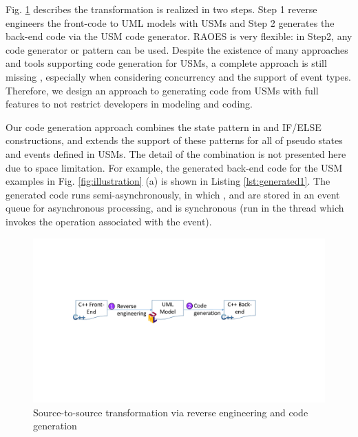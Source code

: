 Fig. \ref{fig:s2stransformation} describes the transformation is realized in two steps.
Step 1 reverse engineers the front-code to UML models with USMs and Step 2 generates the back-end code via the USM code generator.
RAOES is very flexible: in Step2, any code generator or pattern can be used. 
Despite the existence of many approaches and tools supporting code generation for USMs, a complete approach is still missing \cite{Badreddin2014}, especially when considering concurrency and the support of event types.
Therefore, 
we design an approach to generating code from USMs with full features to not restrict developers in modeling and coding. 

Our code generation approach combines the state pattern in \cite{niaz_mapping_2004} and IF/ELSE constructions, and extends the support of these patterns for all of pseudo states and events defined in USMs.
The detail of the combination is not presented here due to space limitation.
For example, the generated back-end code for the USM examples in Fig. \ref{fig:illustration} (a) is shown in Listing \ref{lst:generated1}. 
The generated code runs semi-asynchronously, in which ,  and  are stored in an event queue for asynchronous processing, and  is synchronous (run in the thread which invokes the operation associated with the event).


\begin{figure}
	\centering
	\includegraphics[clip, trim=4.5cm 9.3cm 7.7cm 7.0cm, width=1.0\columnwidth]{figures/s2stransformation.pdf}
	\caption{Source-to-source transformation via reverse engineering and code generation} 
	\label{fig:s2stransformation}
\end{figure}